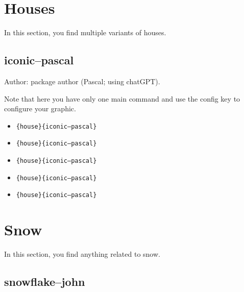 \documentclass{article}
\begin{document}
\section{Houses}

In this section, you find multiple variants of houses.

\subsection{iconic--pascal}

Author: package author (Pascal; using chatGPT). 
\medskip

Note that here you have only one main command and use the config key to configure your graphic.

\begin{itemize}
  \item \texttt{\string\everydaySymbol\{house\}\{iconic--pascal\}} \dotfill\

  \item \texttt{\string\everydaySymbol[config=\{middleDoor,chimney\}]\{house\}\{iconic--pascal\}} \dotfill\

  \item \texttt{\string\everydaySymbol[config=\{rightDoor,leftWindow\}]\{house\}\{iconic--pascal\}} \dotfill\

  \item \texttt{\string\everydaySymbol[config=twoWindows,color=red]\{house\}\{iconic--pascal\}} \dotfill\

  \item \texttt{\string\everydaySymbol[config=\{twoWindows,middleDoor\}]\{house\}\{iconic--pascal\}} \dotfill\

\end{itemize}


\flushbottom
\pagebreak\flushbottom
\section{Snow}

In this section, you find anything related to snow. 

\subsection{snowflake--john}
\end{document}
